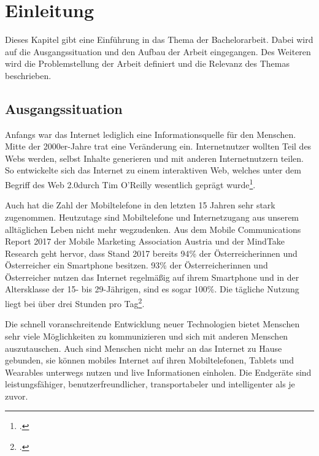 


\chapter{Einleitung}
\label{ch:Einleitung}
Dieses Kapitel gibt eine Einführung in das Thema der Bachelorarbeit. Dabei wird auf die Ausgangssituation und den Aufbau der Arbeit eingegangen. Des Weiteren wird die Problemstellung der Arbeit definiert und die Relevanz des Themas beschrieben.


\section{Ausgangssituation}

Anfangs war das Internet lediglich eine Informationsquelle für den Menschen. Mitte der 2000er-Jahre trat eine Veränderung ein. Internetnutzer wollten Teil des Webs werden, selbst Inhalte generieren und mit anderen Internetnutzern teilen. So entwickelte sich das Internet zu einem interaktiven Web, welches unter dem Begriff des \glqq Web 2.0\grqq  durch Tim O'Reilly wesentlich geprägt wurde\footcite{oreilly}.

Auch hat die Zahl der Mobiltelefone in den letzten 15 Jahren sehr stark zugenommen.
Heutzutage sind Mobiltelefone und Internetzugang aus unserem alltäglichen Leben nicht mehr wegzudenken. Aus dem Mobile Communications Report 2017 der Mobile Marketing Association Austria und der MindTake Research geht hervor, dass Stand 2017 bereits 94\% der Österreicherinnen und Österreicher ein Smartphone besitzen. 93\% der Österreicherinnen und Österreicher nutzen das Internet regelmäßig auf ihrem Smartphone und in der Altersklasse der 15- bis 29-Jährigen, sind es sogar 100\%. Die tägliche Nutzung liegt bei über drei Stunden pro Tag\footcite{MMAA}.

Die schnell voranschreitende Entwicklung neuer Technologien bietet Menschen sehr viele Möglichkeiten zu kommunizieren und sich mit anderen Menschen auszutauschen. Auch sind Menschen nicht mehr an das Internet zu Hause gebunden, sie können mobiles Internet auf ihren Mobiltelefonen, Tablets und Wearables unterwegs nutzen und live Informationen einholen. Die Endgeräte sind leistungsfähiger, benutzerfreundlicher, transportabeler und intelligenter als je zuvor.

